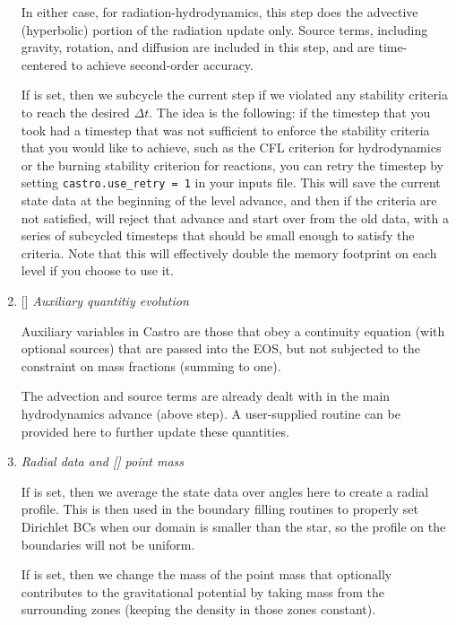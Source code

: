 \begin{enumerate}
  In either case, for radiation-hydrodynamics, this step does the
  advective (hyperbolic) portion of the radiation update only.
  Source terms, including gravity, rotation, and diffusion are
  included in this step, and are time-centered to achieve second-order
  accuracy.

  If  is set, then we subcycle the current
  step if we violated any stability criteria to reach the desired
  $\Delta t$.  The idea is the following: if the timestep that you
  took had a timestep that was not sufficient to enforce the stability
  criteria that you would like to achieve, such as the CFL criterion
  for hydrodynamics or the burning stability criterion for reactions,
  you can retry the timestep by setting {\tt castro.use\_retry = 1} in
  your inputs file. This will save the current state data at the
  beginning of the level advance, and then if the criteria are not
  satisfied, will reject that advance and start over from the old
  data, with a series of subcycled timesteps that should be small
  enough to satisfy the criteria.  Note that this will effectively
  double the memory footprint on each level if you choose to use it.


\item {[]} {\em Auxiliary quantitiy evolution} 

  Auxiliary variables in Castro are those that obey a continuity
  equation (with optional sources) that are passed into the EOS, but
  not subjected to the constraint on mass fractions (summing to one).

  The advection and source terms are already dealt with in the 
  main hydrodynamics advance (above step).  A user-supplied routine
   can be provided here to further update these
  quantities.
  
\item {\em Radial data and {\rm[]} point mass} 

  If  is set, then we average the state data
  over angles here to create a radial profile.  This is then used in the 
  boundary filling routines to properly set Dirichlet BCs when our domain
  is smaller than the star, so the profile on the boundaries will not 
  be uniform.

  If  is set, then we
  change the mass of the point mass that optionally contributes to the
  gravitational potential by taking mass from the surrounding zones
  (keeping the density in those zones constant).


\end{enumerate}
